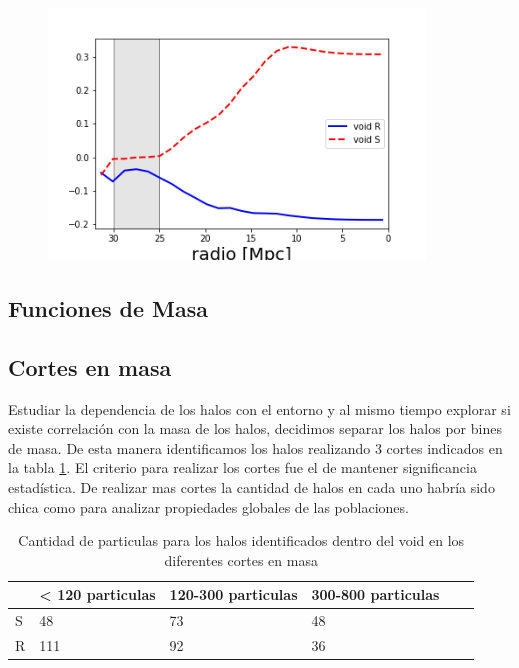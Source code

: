 \begin{figure}[h]
\centering
\includegraphics[width=10cm]{Figures/PerfilesInversos.png}
\decoRule
\caption[asd]{}
\label{PerfilesInversos}
\end{figure}

\subsection{Funciones de Masa}




\subsection{Cortes en masa}

Estudiar la dependencia de los halos con el entorno y al mismo tiempo explorar si existe correlaci\'on con la masa de los halos, decidimos separar los halos por bines de masa. De esta manera identificamos los halos realizando 3 cortes indicados en la tabla \ref{CortesMasa}. El criterio para realizar los cortes fue el de mantener significancia estad\'istica. De realizar mas cortes la cantidad de halos en cada uno habr\'ia sido chica como para analizar propiedades globales de las poblaciones.  


\begin{table}[ht]
\begin{tabular}{|l|l|l|l|l|l|}
\hline
  & < 120 particulas  &  120-300 particulas & 300-800 particulas  \\ \hline
S & 48  & 73 &  48              \\ \hline
R & 111  & 92  &    36             \\ \hline
\end{tabular}
\caption{Cantidad de particulas para los halos identificados dentro del void en los diferentes cortes en masa}
\label{CortesMasa}
\end{table}

